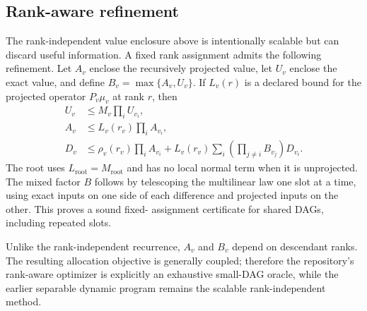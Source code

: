 \subsection{Rank-aware refinement}

The rank-independent value enclosure above is intentionally scalable but can
discard useful information. A fixed rank assignment admits the following
refinement. Let $A_v$ enclose the recursively projected value, let $U_v$
enclose the exact value, and define $B_v=\max\{A_v,U_v\}$. If $L_v(r)$ is a
declared bound for the projected operator $P_v\mu_v$ at rank $r$, then
\begin{align*}
 U_v &\le M_v\prod_i U_{v_i},\\
 A_v &\le L_v(r_v)\prod_i A_{v_i},\\
 D_v &\le \rho_v(r_v)\prod_i A_{v_i}
       +L_v(r_v)\sum_i\left(\prod_{j\ne i}B_{v_j}\right)D_{v_i}.
\end{align*}
The root uses $L_{\mathrm{root}}=M_{\mathrm{root}}$ and has no local normal
term when it is unprojected. The mixed factor $B$ follows by telescoping the
multilinear law one slot at a time, using exact inputs on one side of each
difference and projected inputs on the other. This proves a sound fixed-
assignment certificate for shared DAGs, including repeated slots.

Unlike the rank-independent recurrence, $A_v$ and $B_v$ depend on descendant
ranks. The resulting allocation objective is generally coupled; therefore the
repository's rank-aware optimizer is explicitly an exhaustive small-DAG oracle,
while the earlier separable dynamic program remains the scalable
rank-independent method.
